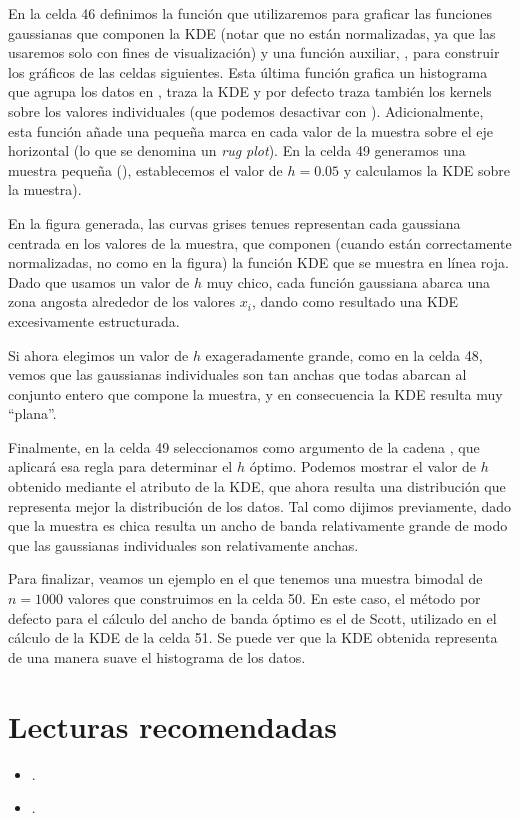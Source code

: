 En la celda 46 definimos la función  que utilizaremos para graficar las funciones gaussianas que componen la KDE (notar que no están normalizadas, ya que las usaremos solo con fines de visualización) y una función auxiliar, , para construir los gráficos de las celdas siguientes. Esta última función grafica un histograma que agrupa los datos en , traza la KDE y por defecto traza también los kernels sobre los valores individuales (que podemos desactivar con ). Adicionalmente, esta función añade una pequeña marca en cada valor de la muestra sobre el eje horizontal (lo que se denomina un \textit{rug plot}). En la celda 49 generamos una muestra pequeña (), establecemos el valor de $h = 0.05$ y calculamos la KDE sobre la muestra).


En la figura generada, las curvas grises tenues representan cada gaussiana centrada en los valores de la muestra, que componen (cuando están correctamente normalizadas, no como en la figura) la función KDE que se muestra en línea roja. Dado que usamos un valor de $h$ muy chico, cada función gaussiana abarca una zona angosta alrededor de los valores $x_i$, dando como resultado una KDE excesivamente estructurada.

Si ahora elegimos un valor de $h$ exageradamente grande, como en la celda 48, vemos que las gaussianas individuales son tan anchas que todas abarcan al conjunto entero que compone la muestra, y en consecuencia la KDE resulta muy ``plana''.


Finalmente, en la celda 49 seleccionamos como argumento de  la cadena , que aplicará esa regla para determinar el $h$ óptimo. Podemos mostrar el valor de $h$ obtenido mediante el atributo  de la KDE, que ahora resulta una distribución que representa mejor la distribución de los datos. Tal como dijimos previamente, dado que la muestra es chica resulta un ancho de banda relativamente grande de modo que las gaussianas individuales son relativamente anchas.


Para finalizar, veamos un ejemplo en el que tenemos una muestra bimodal de $n = 1000$ valores que construimos en la celda 50. En este caso, el método por defecto para el cálculo del ancho de banda óptimo es el de Scott, utilizado en el cálculo de la KDE de la celda 51. Se puede ver que la KDE obtenida representa de una manera suave el histograma de los datos.


\section{Lecturas recomendadas}
\begin{itemize}
 \item {}.
 \item {}.
\end{itemize}

